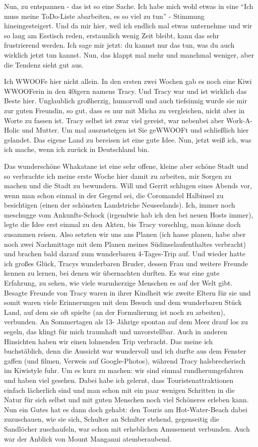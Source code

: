 Nun, zu entspannen - das ist so eine Sache. Ich habe mich wohl etwas in
eine ``Ich muss meine ToDo-Liste abarbeiten, es so viel zu tun'' -
Stimmung hineingesteigert. Und da mir hier, weil ich endlich mal etwas
unternehme und wir so lang am Esstisch reden, erstaunlich wenig Zeit
bleibt, kann das sehr frustrierend werden. Ich sage mir jetzt: du kannst
nur das tun, was du auch wirklich jetzt tun kannst. Nun, das klappt mal
mehr und manchmal weniger, aber die Tendenz sieht gut aus.

Ich WWOOFe hier nicht allein. In den ersten zwei Wochen gab es noch eine
Kiwi WWOOFerin in den 40igern namens Tracy. Und Tracy war und ist
wirklich das Beste hier. Unglaublich großherzig, humorvoll und auch
tiefsinnig wurde sie mir zur guten Freundin, so gut, dass es nur mit
Micha zu vergleichen, nicht aber in Worte zu fassen ist. Tracy selbst
ist zwar viel gereist, war nebenbei aber Work-A-Holic und Mutter. Um mal
auszusteigen ist Sie geWWOOFt und schließlich hier gelandet. Das eigene
Land zu bereisen ist eine gute Idee. Nun, jetzt weiß ich, was ich mache,
wenn ich zurück in Deutschland bin.

Das wunderschöne Whakatane ist eine sehr offene, kleine aber schöne
Stadt und so verbrachte ich meine erste Woche hier damit zu arbeiten,
mir Sorgen zu machen und die Stadt zu bewundern. Will und Gerrit
schlugen eines Abends vor, wenn man schon einmal in der Gegend sei, die
Coromandel Halbinsel zu besichtigen (einen der schönsten Landstriche
Neuseelands). Ich, immer noch meschugge vom Ankunfts-Schock (irgendwie
hab ich den bei neuen Hosts immer), legte die Idee erst einmal zu den
Akten, bis Tracy vorschlug, man könne doch zusammen reisen. Also setzten
wir uns ans Planen (ich hasse planen, habe aber noch zwei Nachmittage
mit dem Planen meines Südinselaufenthaltes verbracht) und brachen bald
darauf zum wunderbaren 4-Tages-Trip auf. Und wieder hatte ich großes
Glück, Tracys wunderbaren Bruder, dessen Frau und weitere Freunde kennen
zu lernen, bei denen wir übernachten durften. Es war eine gute
Erfahrung, zu sehen, wie viele warmherzige Menschen es auf der Welt
gibt. Besagte Freunde von Tracy waren in ihrer Kindheit wie zweite
Eltern für sie und somit waren viele Erinnerungen mit dem Besuch und dem
wunderbaren Stück Land, auf dem sie oft spielte (an der Formulierung ist
noch zu arbeiten), verbunden. An Sommertagen als 13- Jährige spontan auf
dem Meer drauf los zu segeln, das klingt für mich traumhaft und
unvorstellbar. Auch in anderen Hinsichten haben wir einen lohnenden Trip
verbracht. Das meine ich buchstäblich, denn die Aussicht war wundervoll
und ich durfte aus dem Fenster gaffen (und filmen, Verweis auf
Google-Photos), während Tracy halsbrecherisch im Kiwistyle fuhr. Um es
kurz zu machen: wir sind einmal rundherumgefahren und haben viel
gesehen. Dabei habe ich gelernt, dass Touristenattraktionen einfach
lächerlich sind und man schon mit ein paar wenigen Schritten in die
Natur für sich selbst und mit guten Menschen noch viel Schöneres erleben
kann. Nun ein Gutes hat es dann doch gehabt: den Touris am
Hot-Water-Beach dabei zuzuschauen, wie sie sich, Schulter an Schulter
stehend, gegenseitig die Sandlöcher zuschaufeln, war schon mit
erheblichen Amusement verbunden. Auch war der Anblick von Mount Manganui
atemberaubend.

